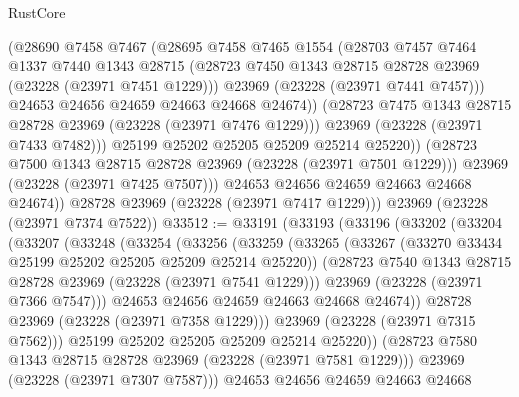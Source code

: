 \begin{lexlean}{RustCore}
\begin{coremodule}
                  (@28690
                    @7458
                    @7467
                    (@28695
                      @7458
                      @7465
                      @1554
                      (@28703
                        @7457
                        @7464
                        @1337
                        @7440
                        @1343
                        @28715
                        (@28723 @7450 @1343 @28715 @28728 @23969 (@23228 (@23971 @7451 @1229)))
                        @23969
                        (@23228 (@23971 @7441 @7457)))
                      @24653
                      @24656
                      @24659
                      @24663
                      @24668
                      @24674))
                  (@28723 @7475 @1343 @28715 @28728 @23969 (@23228 (@23971 @7476 @1229)))
                  @23969
                  (@23228 (@23971 @7433 @7482)))
                @25199
                @25202
                @25205
                @25209
                @25214
                @25220))
            (@28723 @7500 @1343 @28715 @28728 @23969 (@23228 (@23971 @7501 @1229)))
            @23969
            (@23228 (@23971 @7425 @7507)))
          @24653
          @24656
          @24659
          @24663
          @24668
          @24674))
      @28728
      @23969
      (@23228 (@23971 @7417 @1229)))
    @23969
    (@23228 (@23971 @7374 @7522))
@33512 := @33191
    (@33193
      (@33196
        (@33202
          (@33204
            (@33207
              (@33248
                (@33254
                  (@33256
                    (@33259
                      (@33265
                        (@33267 (@33270 @33434 @25199 @25202 @25205 @25209 @25214 @25220))
                        (@28723 @7540 @1343 @28715 @28728 @23969 (@23228 (@23971 @7541 @1229)))
                        @23969
                        (@23228 (@23971 @7366 @7547)))
                      @24653
                      @24656
                      @24659
                      @24663
                      @24668
                      @24674))
                  @28728
                  @23969
                  (@23228 (@23971 @7358 @1229)))
                @23969
                (@23228 (@23971 @7315 @7562)))
              @25199
              @25202
              @25205
              @25209
              @25214
              @25220))
          (@28723 @7580 @1343 @28715 @28728 @23969 (@23228 (@23971 @7581 @1229)))
          @23969
          (@23228 (@23971 @7307 @7587)))
        @24653
        @24656
        @24659
        @24663
        @24668

\end{coremodule}
\end{lexlean}
